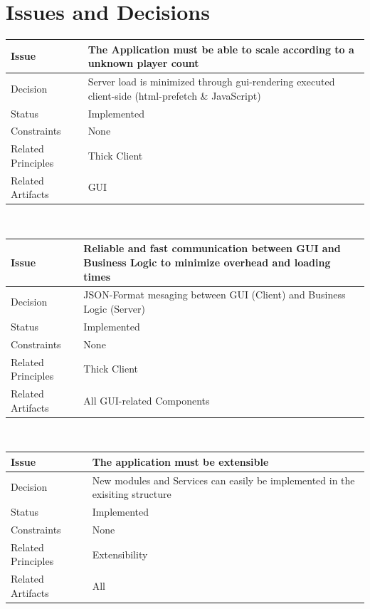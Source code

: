 \documentclass[a4paper]{article}
\begin{document}
\clearpage

\section{Issues and Decisions}

\begin{tabular}[t]{|l|p{10cm}|}
\hline
\textbf{Issue}	&	The Application must be able to scale according to a unknown player count\\
\hline
Decision & Server load is minimized through gui-rendering executed client-side (html-prefetch \& JavaScript)\\
\hline
Status	& Implemented\\
\hline
Constraints	&	None\\
\hline
Related Principles	&	Thick Client\\
\hline
Related Artifacts	&	GUI\\
\hline
\end{tabular}\\

\begin{tabular}[t]{|l|p{10cm}|}
\hline
\textbf{Issue}	&	Reliable and fast communication between GUI and Business Logic to minimize overhead and loading times\\
\hline
Decision	&	JSON-Format mesaging between GUI (Client) and Business Logic (Server)\\
\hline
Status	& Implemented\\
\hline
Constraints	&	None\\
\hline
Related Principles	&	Thick Client\\
\hline
Related Artifacts	&	All GUI-related Components\\
\hline
\end{tabular}\\

\begin{tabular}[t]{|l|p{10cm}|}
\hline
\textbf{Issue}	&	The application must be extensible\\
\hline
Decision & New modules and Services can easily be implemented in the exisiting structure\\
\hline
Status	& Implemented\\
\hline
Constraints	&	None\\
\hline
Related Principles	&	Extensibility\\
\hline
Related Artifacts	&	All\\
\hline
\end{tabular}\\
\end{document}
